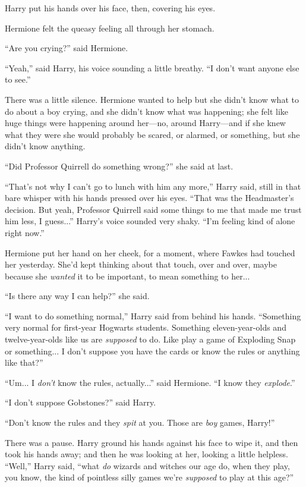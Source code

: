 Harry put his hands over his face, then, covering his eyes.

Hermione felt the queasy feeling all through her stomach.

“Are you crying?” said Hermione.

“Yeah,” said Harry, his voice sounding a little breathy. “I don’t want anyone else to see.”

There was a little silence. Hermione wanted to help but she didn’t know what to do about a boy crying, and she didn’t know what was happening; she felt like huge things were happening around her—no, around Harry—and if she knew what they were she would probably be scared, or alarmed, or something, but she didn’t know anything.

“Did Professor Quirrell do something wrong?” she said at last.

“That’s not why I can’t go to lunch with him any more,” Harry said, still in that bare whisper with his hands pressed over his eyes. “That was the Headmaster’s decision. But yeah, Professor Quirrell said some things to me that made me trust him less, I guess...” Harry’s voice sounded very shaky. “I’m feeling kind of alone right now.”

Hermione put her hand on her cheek, for a moment, where Fawkes had touched her yesterday. She’d kept thinking about that touch, over and over, maybe because she \emph{wanted} it to be important, to mean something to her...

“Is there any way I can help?” she said.

“I want to do something normal,” Harry said from behind his hands. “Something very normal for first-year Hogwarts students. Something eleven-year-olds and twelve-year-olds like us are \emph{supposed} to do. Like play a game of Exploding Snap or something... I don’t suppose you have the cards or know the rules or anything like that?”

“Um... I \emph{don’t} know the rules, actually...” said Hermione. “I know they \emph{explode}.”

“I don’t suppose Gobstones?” said Harry.

“Don’t know the rules and they \emph{spit} at you. Those are \emph{boy} games, Harry!”

There was a pause. Harry ground his hands against his face to wipe it, and then took his hands away; and then he was looking at her, looking a little helpless. “Well,” Harry said, “what \emph{do} wizards and witches our age do, when they play, you know, the kind of pointless silly games we’re \emph{supposed} to play at this age?”

